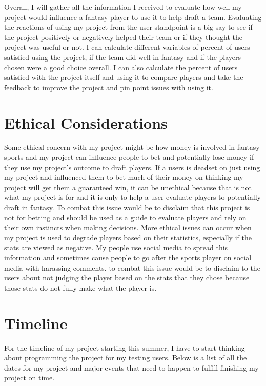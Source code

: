 \documentclass[10pt,twocolumn]{article}
\begin{document}
Overall, I will gather all the information I received to evaluate how well my project would influence a fantasy player to use it to help draft a team. Evaluating the reactions of using my project from the user standpoint is a big say to see if the project positively or negatively helped their team or if they thought the project was useful or not. I can calculate different variables of percent of users satisfied using the project, if the team did well in fantasy and if the players chosen were a good choice overall. I can also calculate the percent of users satisfied with the project itself and using it to compare players and take the feedback to improve the project and pin point issues with using it. 

\section{Ethical Considerations}
Some ethical concern with my project might be how money is involved in fantasy sports and my project can influence people to bet and potentially lose money if they use my project's outcome to draft players. If a users is deadset on just using my project and influenced them to bet much of their money on thinking my project will get them a guaranteed win, it can be unethical because that is not what my project is for and it is only to help a user evaluate players to potentially draft in fantasy. To combat this issue would be to disclaim that this project is not for betting and should be used as a guide to evaluate players and rely on their own instincts when making decisions. More ethical issues can occur when my project is used to degrade players based on their statistics, especially if the stats are viewed as negative. My people use social media to spread this information and sometimes cause people to go after the sports player on social media with harassing comments. to combat this issue would be to disclaim to the users about not judging the player based on the stats that they chose because those stats do not fully make what the player is. 

\section{Timeline}
For the timeline of my project starting this summer, I have to start thinking about programming the project for my testing users. Below is a list of all the dates for my project and major events that need to happen to fulfill finishing my project on time. 
\end{document}
